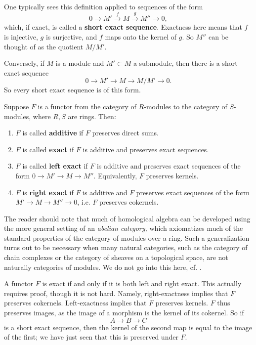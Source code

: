 One typically sees this definition applied to sequences of the form
\[ 0 \to M'\stackrel{f}{ \to} M \stackrel{g}{\to} M'' \to 0,  \]
which, if exact, is called a \textbf{short exact sequence}. 
Exactness here means that $f$ is injective, $g$ is surjective, and $f$ maps
onto the kernel of $g$.  So $M''$ can be thought of as the quotient $M/M'$.

\begin{example} 
Conversely, if $M$ is a module and $M' \subset M$ a submodule, then there is a
short exact sequence
\[ 0 \to M' \to M \to M/M' \to 0.  \]
So every short exact sequence is of this form.
\end{example} 


Suppose   $F$ is a functor from the category of $R$-modules to the
category of  $S$-modules, where $R, S$ are rings.  Then:

\begin{definition} 
\begin{enumerate}
\item  $F$ is called \textbf{additive} if $F$ preserves direct sums.  
\item  $F$ is called \textbf{exact} if $F$ is additive and preserves exact sequences.  
\item  $F$ is called \textbf{left exact} if $F$ is additive and preserves exact sequences of the form
$0 \to M' \to M \to M''$.  Equivalently, $F$ preserves kernels.  
\item  $F$ is \textbf{right exact} if $F$ is additive and $F$ preserves exact
sequences of the form $M' \to M \to M'' \to 0$, i.e. $F$ preserves cokernels.  
\end{enumerate}
\end{definition} 

The reader should note that much of homological algebra can be developed using the more
general setting of an \emph{abelian category,}  which axiomatizes much of the
standard properties of the category of modules over a ring. Such a
generalization turns out to be necessary when many natural categories, such as
the category of chain complexes or the category of sheaves on a topological
space, are not naturally categories of modules.
We do not go into this here, cf. \cite{Ma98}. 



A functor  $F$	is exact if and only if it is both left and right exact.  
This actually requires proof, though it is not hard. Namely, right-exactness implies that $F$
preserves cokernels. Left-exactness implies that $F$ preserves kernels. $F$
thus preserves images, as the image of a morphism is the kernel of its cokernel.
So if
\[ A \to B \to C  \]
is a short exact sequence, then the kernel of the second map is equal to the
image of the first; we have just seen that this is preserved under $F$.


